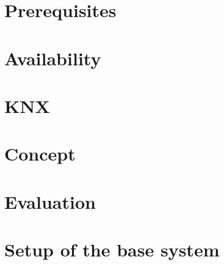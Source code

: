 \documentclass[a4paper,12pt,oneside,openright]{memoir}
\begin{document}
\chapter{Prerequisites}
\label{ch:prerequisites}




\chapter{Availability}
\label{ch:availability}



\chapter{KNX}
\label{ch:knx}







\chapter{Concept}
\label{ch:concept}



\chapter{Evaluation}
\label{ch:implementation}



\appendix

\nocite{*}	%

\chapter{Setup of the base system}
\label{ch:basesystem}


\printglossary
\printbibliography
\end{document}
